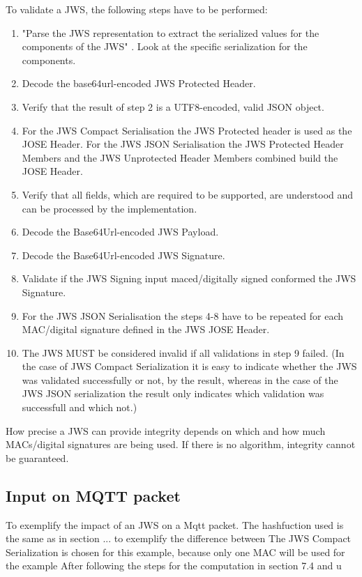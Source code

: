 To validate a JWS, the following steps have to be performed:\newline  
\begin{enumerate} [leftmargin=1cm, rightmargin=1cm] \itemsep0.3em
\item "Parse the JWS representation to extract the serialized values for the components of the JWS" \cite{rfc7515}. Look at the specific serialization for the components.
\item Decode the base64url-encoded JWS Protected Header.
\item Verify that the result of step 2 is a UTF8-encoded, valid JSON object.
\item For the JWS Compact Serialisation the JWS Protected header is used as the JOSE Header. For the JWS JSON Serialisation the JWS Protected Header Members and the JWS Unprotected Header Members combined build the JOSE Header.
\item Verify that all fields, which are required to be supported, are understood and can be processed by the implementation.

\item Decode the Base64Url-encoded JWS Payload.
\item Decode the Base64Url-encoded JWS Signature.
\item Validate if the JWS Signing input maced/digitally signed conformed the JWS Signature.
\item For the JWS JSON Serialisation the steps 4-8 have to be repeated for each MAC/digital signature defined in the JWS JOSE Header.
\item The JWS MUST be considered invalid if all validations in step 9 failed. (In the case of JWS Compact Serialization it is easy to indicate whether the JWS was validated successfully or not, by the result, whereas in the case of the JWS JSON serialization the result only indicates which validation was successfull and which not.)
\end{enumerate}
How precise a JWS can provide integrity depends on which and how much MACs/digital signatures are being used. If there is no algorithm, integrity cannot be guaranteed. 

\subsection{Input on MQTT packet}
To exemplify the impact of an JWS on a Mqtt packet. The hashfuction used is the same as in section ... to exemplify the difference between 
The JWS Compact Serialization is chosen for this example, because only one MAC will be used for the example
After following the steps for the computation in section 7.4 and u

